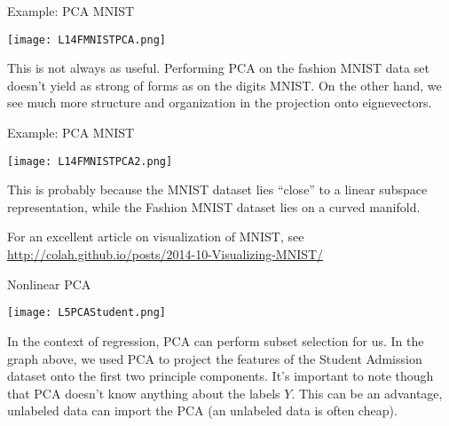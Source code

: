 \documentclass[10pt, table, dvipsnames,xcdraw,handout]{beamer}
\begin{document}
\begin{frame}[fragile]{Example: PCA MNIST}
  \begin{minipage}[t][0.5\textheight][t]{\textwidth}
	\centering \texttt{[image: L14FMNISTPCA.png]} 
  \end{minipage}
  \vfill
\begin{minipage}[t][0.5\textheight][t]{\textwidth}
This is not always as useful. Performing PCA on the fashion MNIST data set doesn't yield as strong of forms as on the digits MNIST. On the other hand, we see much more structure and organization in the projection onto eignevectors. 
\end{minipage}
\end{frame}



\begin{frame}[fragile]{Example: PCA MNIST}
  \begin{minipage}[t][0.5\textheight][t]{\textwidth}
	\centering \texttt{[image: L14FMNISTPCA2.png]} 
  \end{minipage}
  \vfill
\begin{minipage}[t][0.5\textheight][t]{\textwidth}
This is probably because the MNIST dataset lies ``close'' to a linear subspace representation, while the Fashion MNIST dataset lies on a curved manifold. 

For an excellent article on visualization of MNIST, see \url{http://colah.github.io/posts/2014-10-Visualizing-MNIST/}
\end{minipage}
\end{frame}







\begin{frame}[fragile]{Nonlinear PCA}
  \begin{minipage}[t][0.5\textheight][t]{\textwidth}
	\centering \texttt{[image: L5PCAStudent.png]} 
  \end{minipage}
  \vfill
\begin{minipage}[t][0.5\textheight][t]{\textwidth}
In the context of regression, PCA can perform subset selection for us. In the graph above, we used PCA to project the features of the Student Admission dataset onto the first two principle components. It's important to note though that PCA doesn't know anything about the labels $Y$. This can be an advantage, unlabeled data can import the PCA (an unlabeled data is often cheap).
\end{minipage}
\end{frame}
\end{document}
